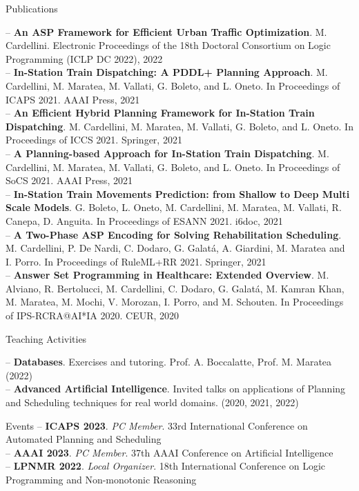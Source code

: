 \documentclass{resume} %
\begin{document}
\begin{rSection}{Publications}

-- \textbf{An ASP Framework for Efficient Urban Traffic Optimization}. M. Cardellini. Electronic Proceedings of the 18th Doctoral Consortium on Logic Programming (ICLP DC 2022), 2022 \\
-- \textbf{In-Station Train Dispatching: A PDDL+ Planning Approach}. M. Cardellini, M. Maratea, M. Vallati, G. Boleto, and L. Oneto. In Proceedings of ICAPS 2021. AAAI Press, 2021 \\
-- \textbf{An Efficient Hybrid Planning Framework for In-Station Train Dispatching}. M. Cardellini, M. Maratea, M. Vallati, G. Boleto, and L. Oneto. In Proceedings of ICCS 2021. Springer, 2021 \\
-- \textbf{A Planning-based Approach for In-Station Train Dispatching}. M. Cardellini, M. Maratea, M. Vallati, G. Boleto, and L. Oneto. In Proceedings of SoCS 2021. AAAI Press, 2021\\
-- \textbf{In-Station Train Movements Prediction: from Shallow to Deep Multi Scale Models}. G. Boleto, L. Oneto, M. Cardellini, M. Maratea, M. Vallati, R. Canepa, D. Anguita. In Proceedings of ESANN 2021. i6doc, 2021\\
-- \textbf{A Two-Phase ASP Encoding for Solving Rehabilitation Scheduling}. M. Cardellini, P. De Nardi, C. Dodaro, G. Galat\'a, A. Giardini, M. Maratea and I. Porro. In Proceedings of RuleML+RR 2021. Springer, 2021\\
-- \textbf{Answer Set Programming in Healthcare: Extended Overview}. M. Alviano, R. Bertolucci, M. Cardellini, C. Dodaro, G. Galat\'a, M. Kamran Khan, M. Maratea, M. Mochi, V. Morozan, I. Porro, and M. Schouten. In Proceedings of IPS-RCRA@AI*IA 2020. CEUR, 2020
\end{rSection}

\begin{rSection}{Teaching Activities}

-- \textbf{Databases}. Exercises and tutoring. Prof. A. Boccalatte, Prof. M. Maratea (2022)\\
-- \textbf{Advanced Artificial Intelligence}. Invited talks on applications of Planning and Scheduling techniques for real world domains. (2020, 2021, 2022)
\end{rSection}


\begin{rSection}{Events}
-- \textbf{ICAPS 2023}. \textit{PC Member}. 33rd International Conference on Automated Planning and Scheduling \\
-- \textbf{AAAI 2023}. \textit{PC Member}. 37th AAAI Conference on Artificial Intelligence  \\
-- \textbf{LPNMR 2022}. \textit{Local Organizer}. 18th International Conference on Logic Programming and Non-monotonic Reasoning  \\
\end{rSection}
\end{document}
